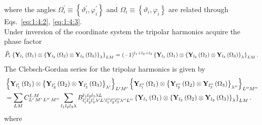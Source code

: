 where the angles $\Omega_{i}^{\prime} \equiv\left\{\vartheta_{i}^{\prime}, \varphi_{i}^{\prime}\right\}$ and $\Omega_{i} \equiv\left\{\vartheta_{i}, \varphi_{i}\right\}$ are related through Eqs.~\eqref{eq:1:4:2}, \eqref{eq:1:4:3}.\\
Under inversion of the coordinate system the tripolar harmonics acquire the phase factor
\begin{equation}
\widehat{P}_{r}\left\{\mathbf{Y}_{l_{1}}\left(\Omega_{1}\right) \otimes\left\{\mathbf{Y}_{l_{2}}\left(\Omega_{2}\right) \otimes \mathbf{Y}_{l_{3}}\left(\Omega_{3}\right)\right\}_{\lambda}\right\}_{L M}=(-1)^{l_{1}+l_{2}+l_{3}}\left\{\mathbf{Y}_{l_{1}}\left(\Omega_{1}\right) \otimes\left\{\mathbf{Y}_{l_{2}}\left(\Omega_{2}\right) \otimes \mathbf{Y}_{l_{3}}\left(\Omega_{3}\right)\right\}_{\lambda}\right\}_{L M}. \label{eq:5:16:16}
\end{equation}
The Clebsch-Gordan series for the tripolar harmonics is given by
\begin{align}
& \left\{\mathbf{Y}_{l_{1}^{\prime}}\left(\Omega_{1}\right) \otimes\left\{\mathbf{Y}_{l_{2}^{\prime}}\left(\Omega_{2}\right) \otimes \mathbf{Y}_{l_{3}^{\prime}}\left(\Omega_{3}\right)\right\}_{\lambda^{\prime}}\right\}_{L^{\prime} M^{\prime}}\left\{\mathbf{Y}_{l_{1}^{\prime \prime}}\left(\Omega_{1}\right) \otimes\left\{\mathbf{Y}_{l_{2}^{\prime \prime}}\left(\Omega_{2}\right) \otimes \mathbf{Y}_{l_{3}^{\prime \prime}}\left(\Omega_{3}\right)\right\}_{\lambda^{\prime \prime}}\right\}_{L^{\prime \prime} M^{\prime \prime}}  \notag\\
& =\sum_{L M} C_{L^{\prime}\,M^{\prime}\,L^{\prime \prime}\,M^{\prime \prime}}^{L\,M} \sum_{l_{1} l_{2} l_{3} \lambda} B_{l_{1}^{\prime} l_{2}^{\prime} l_{3}^{\prime} \lambda^{\prime} L^{\prime} l_{1}^{\prime \prime} l_{2}^{\prime \prime} l_{3}^{\prime \prime} \lambda^{\prime \prime} L^{\prime \prime}}^{l_{1} l_{2} l_{3} \lambda L}\left\{\mathbf{Y}_{l_{1}}\left(\Omega_{1}\right) \otimes\left\{\mathbf{Y}_{l_{2}}\left(\Omega_{2}\right) \otimes \mathbf{Y}_{l_{3}}\left(\Omega_{3}\right)\right\}_{\lambda}\right\}_{L M}. \label{eq:5:16:17}
\end{align}
where
